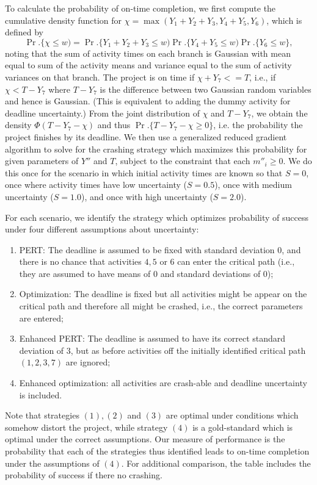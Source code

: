 \documentclass[11pt]{article}
\begin{document}
To calculate the probability of on-time completion, we first compute the cumulative density function for $\chi =  \max(Y_1 + Y_2 + Y_3, Y_4+Y_5, Y_6)$, which is defined by 
$$\Pr.\{ \chi \leq w) =  \Pr.\{Y_1 + Y_2 + Y_3 \leq w) \Pr.\{Y_4 + Y_5\leq w) \Pr.\{Y_6 \leq w \},$$ noting that the sum of activity times on each branch is Gaussian with mean equal to sum of the activity means and variance equal to the sum of activity variances on that branch. The project is on time if $\chi + Y_7 <= T$, i.e., if $ \chi < T-Y_7$ where $T-Y_7$ is the difference between two Gaussian random variables and hence is Gaussian. (This is equivalent to adding the dummy activity for deadline uncertainty.) From the joint distribution of $\chi$  and $T-Y_7$, we obtain the density $\Phi(T - Y_{7} - \chi) $ and thus $\Pr.\{ T - Y_{7} - \chi \geq 0\}$, i.e. the probability the project finishes by its deadline. 
We then use a generalized reduced gradient algorithm to solve for the crashing strategy which maximizes this probability for given parameters of $Y''$ and $T$, subject to the constraint that each $m''_i \geq 0$. We do this once for the scenario in which initial activity times are known so that $S = 0$, once where activity times have low uncertainty ($S = 0.5$), once with medium uncertainty ($S = 1.0$), and once with high uncertainty ($S = 2.0$). \par
For each scenario, we identify the strategy which optimizes probability of success under four different assumptions about uncertainty:
\begin{enumerate}
\item PERT: The deadline is assumed to be fixed with standard deviation $0$, and there is no chance that activities $4, 5$ or $6$ can enter the critical path (i.e., they are assumed to have means of $0$ and standard deviations of $0$);
\item Optimization: The deadline is fixed but all activities might be appear on the critical path and therefore all might be crashed, i.e., the correct parameters are entered;
\item Enhanced PERT: The deadline is assumed to have its correct standard deviation of $3$, but as before activities off the initially identified critical path $(1,2,3, 7)$ are ignored; 
\item Enhanced optimization: all activities are crash-able and deadline uncertainty is included.
\end{enumerate}
 Note that strategies $(1), (2)$ and $(3)$ are optimal under conditions which somehow distort the project, while strategy $(4)$ is a gold-standard which is optimal under the correct assumptions. Our measure of performance is the probability that each of the strategies thus identified leads to on-time completion under the assumptions of $(4)$. For additional comparison, the table includes the probability of success if there no crashing. 
\end{document}
